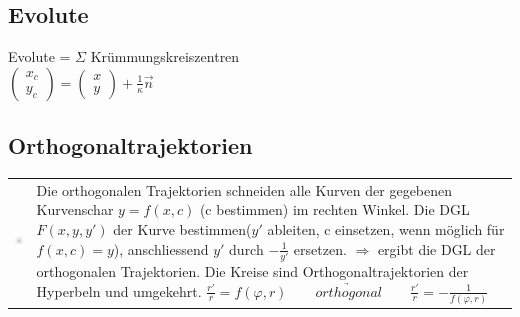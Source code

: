\subsection{Evolute}
Evolute = $\Sigma$ Krümmungskreiszentren\\
$\left(\begin{matrix} x_c \\ y_c \end{matrix}\right) = \left(\begin{matrix} x \\  y \end{matrix}\right) + \frac{1}{\kappa}\overrightarrow{n}$

\subsection{Orthogonaltrajektorien}
\begin{tabular}{ll}
\parbox{2.5cm}{
\includegraphics[height=2.5cm]{./bilder/orthoTrajekt.png}
}
& \parbox{16.5cm}{
Die orthogonalen Trajektorien schneiden alle Kurven der gegebenen Kurvenschar
$y=f(x,c)$ (c bestimmen) im rechten Winkel.
Die DGL $F(x,y,y')$ der Kurve bestimmen($y'$ ableiten, c einsetzen, wenn möglich für $f(x,c) = y$), anschliessend $y'$ durch
$-\frac{1}{y'}$ ersetzen.
$\Rightarrow$ ergibt die DGL der orthogonalen Trajektorien.\\
Die Kreise sind Orthogonaltrajektorien der Hyperbeln und umgekehrt.\\
$\frac{r'}{r} = f(\varphi , r) \qquad \underrightarrow{orthogonal}  \qquad \frac{r'}{r} = - \frac{1}{f(\varphi , r)}$
}
\end{tabular}

